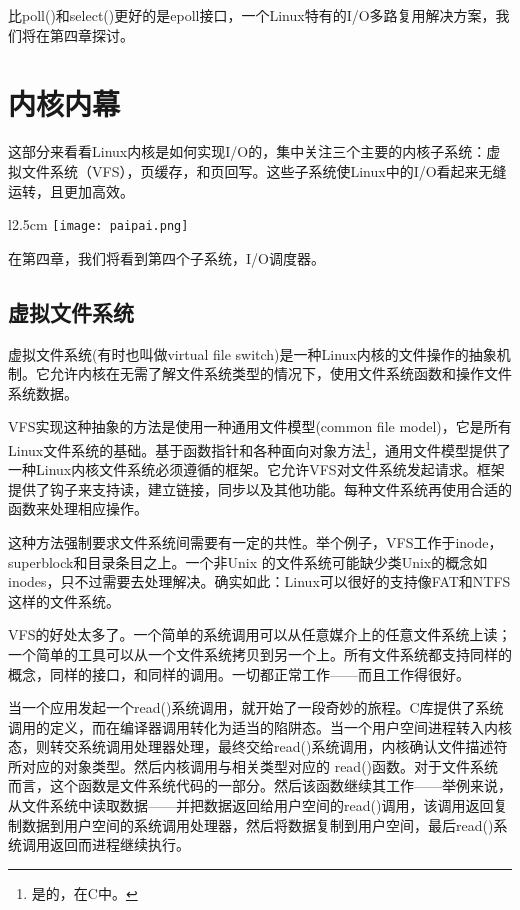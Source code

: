 比poll()和select()更好的是epoll接口，一个Linux特有的I/O多路复用解决方案，我们将在第四章探讨。

\section{内核内幕}

这部分来看看Linux内核是如何实现I/O的，集中关注三个主要的内核子系统：虚拟文件系统（VFS），页缓存，和页回写。这些子系统使Linux中的I/O看起来无缝运转，且更加高效。 

\begin{wrapfigure}{l}{2.5cm}
  \texttt{[image: paipai.png]}
\end{wrapfigure}
\mbox{}在第四章，我们将看到第四个子系统，I/O调度器。 

\subsection{虚拟文件系统}

虚拟文件系统(有时也叫做virtual file switch)是一种Linux内核的文件操作的抽象机制。它允许内核在无需了解文件系统类型的情况下，使用文件系统函数和操作文件系统数据。

VFS实现这种抽象的方法是使用一种通用文件模型(common file model)，它是所有Linux文件系统的基础。基于函数指针和各种面向对象方法\footnote[1]{是的，在C中。}，通用文件模型提供了一种Linux内核文件系统必须遵循的框架。它允许VFS对文件系统发起请求。框架提供了钩子来支持读，建立链接，同步以及其他功能。每种文件系统再使用合适的函数来处理相应操作。

这种方法强制要求文件系统间需要有一定的共性。举个例子，VFS工作于inode，superblock和目录条目之上。一个非Unix 的文件系统可能缺少类Unix的概念如inodes，只不过需要去处理解决。确实如此：Linux可以很好的支持像FAT和NTFS这样的文件系统。

VFS的好处太多了。一个简单的系统调用可以从任意媒介上的任意文件系统上读；一个简单的工具可以从一个文件系统拷贝到另一个上。所有文件系统都支持同样的概念，同样的接口，和同样的调用。一切都正常工作——而且工作得很好。

当一个应用发起一个read()系统调用，就开始了一段奇妙的旅程。C库提供了系统调用的定义，而在编译器调用转化为适当的陷阱态。当一个用户空间进程转入内核态，则转交系统调用处理器处理，最终交给read()系统调用，内核确认文件描述符所对应的对象类型。然后内核调用与相关类型对应的 read()函数。对于文件系统而言，这个函数是文件系统代码的一部分。然后该函数继续其工作——举例来说，从文件系统中读取数据——并把数据返回给用户空间的read()调用，该调用返回复制数据到用户空间的系统调用处理器，然后将数据复制到用户空间，最后read()系统调用返回而进程继续执行。

